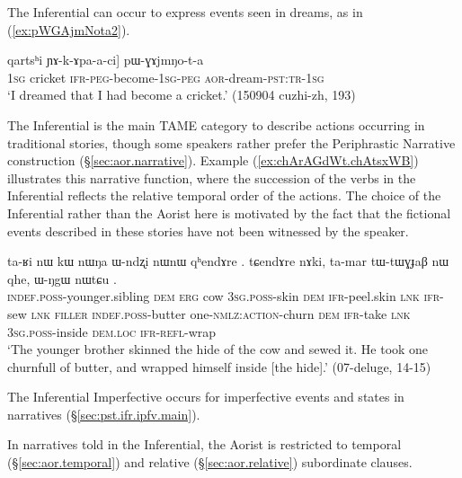 The Inferential can occur to express events seen in dreams, as in (\ref{ex:pWGAjmNota2}).

\begin{exe}
\ex \label{ex:pWGAjmNota2}
 \gll [aʑo [...] qartsʰi ɲɤ-k-ɤpa-a-ci] pɯ-ɣɤjmŋo-t-a \\
\textsc{1sg} {  } cricket \textsc{ifr}-\textsc{peg}-become-\textsc{1sg}-\textsc{peg} \textsc{aor}-dream-\textsc{pst}:\textsc{tr}-\textsc{1sg} \\
\glt `I dreamed that I had become a cricket.' (150904 cuzhi-zh, 193)
\end{exe}

The Inferential is the main TAME category to describe actions occurring in traditional stories, though some speakers rather prefer the Periphrastic Narrative construction (§\ref{sec:aor.narrative}). Example (\ref{ex:chArAGdWt.chAtsxWB}) illustrates this narrative function, where the succession of the verbs in the Inferential reflects the relative temporal order of the actions. The choice of the Inferential rather than the Aorist here is motivated by the fact that the fictional events described in these stories have not been witnessed by the speaker. 


\begin{exe}
\ex \label{ex:chArAGdWt.chAtsxWB}
 \gll ta-ʁi nɯ kɯ nɯŋa ɯ-ndʐi nɯnɯ  qʰendɤre . tɕendɤre nɤki, ta-mar tɯ-tɯɣɟaβ nɯ  qhe, ɯ-ŋgɯ nɯtɕu . \\
 \textsc{indef}.\textsc{poss}-younger.sibling \textsc{dem} \textsc{erg} cow \textsc{3sg}.\textsc{poss}-skin \textsc{dem} \textsc{ifr}-peel.skin \textsc{lnk} \textsc{ifr}-sew \textsc{lnk} \textsc{filler} \textsc{indef}.\textsc{poss}-butter one-\textsc{nmlz}:\textsc{action}-churn \textsc{dem} \textsc{ifr}-take \textsc{lnk} \textsc{3sg}.\textsc{poss}-inside \textsc{dem}.\textsc{loc} \textsc{ifr}-\textsc{refl}-wrap \\
 \glt `The younger brother skinned the hide of the cow and sewed it. He took one churnfull of butter, and wrapped himself inside [the hide].' (07-deluge, 14-15)
\end{exe}

The Inferential Imperfective occurs for imperfective events and states in narratives (§\ref{sec:pst.ifr.ipfv.main}).

In narratives told in the Inferential, the Aorist is restricted to temporal (§\ref{sec:aor.temporal}) and relative (§\ref{sec:aor.relative}) subordinate clauses.

